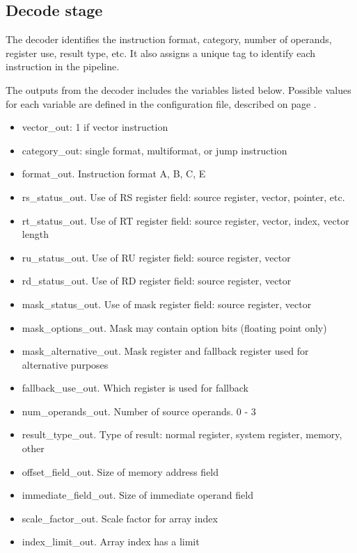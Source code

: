 \documentclass[11pt,a4paper,oneside,openright]{report}
\newcommand{\vv}{ \vspace{2mm} }   %
\begin{document}
\subsection{Decode stage}
The decoder identifies the instruction format, category, number of operands, register use, result type, etc. It also assigns a unique tag to identify each instruction in the pipeline.
\vv

The outputs from the decoder includes the variables listed below. Possible values for each variable are defined in the configuration file, described on page \pageref{SettingConfiguration}.
\vv

\begin{itemize}
\item vector\_out: 1 if vector instruction
\item category\_out: single format, multiformat, or jump instruction
\item format\_out. Instruction format A, B, C, E
\item rs\_status\_out. Use of RS register field: source register, vector, pointer, etc.
\item rt\_status\_out. Use of RT register field: source register, vector, index, vector length
\item ru\_status\_out. Use of RU register field: source register, vector
\item rd\_status\_out. Use of RD register field: source register, vector
\item mask\_status\_out. Use of mask register field: source register, vector
\item mask\_options\_out. Mask may contain option bits (floating point only)
\item mask\_alternative\_out. Mask register and fallback register used for alternative purposes
\item fallback\_use\_out. Which register is used for fallback
\item num\_operands\_out. Number of source operands. 0 - 3
\item result\_type\_out. Type of result: normal register, system register, memory, other
\item offset\_field\_out. Size of memory address field
\item immediate\_field\_out. Size of immediate operand field
\item scale\_factor\_out. Scale factor for array index
\item index\_limit\_out. Array index has a limit
\end{itemize}
\vv
\end{document}
